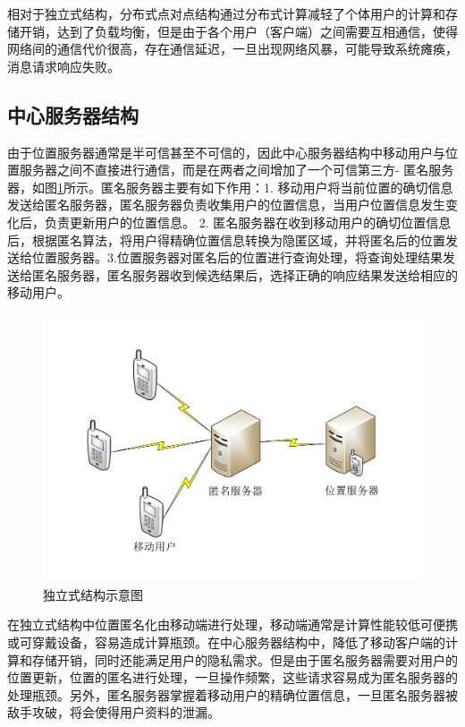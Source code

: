 相对于独立式结构，分布式点对点结构通过分布式计算减轻了个体用户的计算和存储开销，达到了负载均衡，但是由于各个用户（客户端）之间需要互相通信，使得网络间的通信代价很高，存在通信延迟，一旦出现网络风暴，可能导致系统瘫痪，消息请求响应失败。


\subsection{中心服务器结构}
由于位置服务器通常是半可信甚至不可信的，因此中心服务器结构中移动用户与位置服务器之间不直接进行通信，而是在两者之间增加了一个可信第三方- 匿名服务器，如图\ref{fig:centralized_pdf}所示。匿名服务器主要有如下作用：1. 移动用户将当前位置的确切信息发送给匿名服务器，匿名服务器负责收集用户的位置信息，当用户位置信息发生变化后，负责更新用户的位置信息。 2. 匿名服务器在收到移动用户的确切位置信息后，根据匿名算法，将用户得精确位置信息转换为隐匿区域，并将匿名后的位置发送给位置服务器。3.位置服务器对匿名后的位置进行查询处理，将查询处理结果发送给匿名服务器，匿名服务器收到候选结果后，选择正确的响应结果发送给相应的移动用户。

\begin{figure}[H]
\centering
\includegraphics[width=15 cm]{fig/centralized.pdf}
\caption{独立式结构示意图} %
\label{fig:centralized_pdf}
\end{figure}

在独立式结构中位置匿名化由移动端进行处理，移动端通常是计算性能较低可便携或可穿戴设备，容易造成计算瓶颈。在中心服务器结构中，降低了移动客户端的计算和存储开销，同时还能满足用户的隐私需求。但是由于匿名服务器需要对用户的位置更新，位置的匿名进行处理，一旦操作频繁，这些请求容易成为匿名服务器的处理瓶颈。另外，匿名服务器掌握着移动用户的精确位置信息，一旦匿名服务器被敌手攻破，将会使得用户资料的泄漏。

